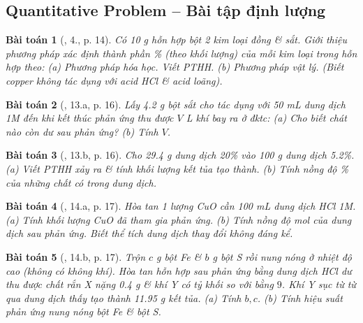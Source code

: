 \documentclass{article}
\newtheorem{baitoan}{Bài toán}
\begin{document}
\subsection{Quantitative Problem -- Bài tập định lượng}

\begin{baitoan}[\cite{SGK_Hoa_Hoc_9}, 4., p. 14]
	Có \emph{10 g} hỗn hợp bột 2 kim loại đồng \& sắt. Giới thiệu phương pháp xác định thành phần \% (theo khối lượng) của mỗi kim loại trong hỗn hợp theo: (a) Phương pháp hóa học. Viết PTHH. (b) Phương pháp vật lý. (Biết copper không tác dụng với acid \emph{HCl} \& acid \emph{} loãng).
\end{baitoan}

\begin{baitoan}[\cite{An_350_BT_Hoa_Hoc_9}, 13.a, p. 16]
	Lấy \emph{4.2 g} bột sắt cho tác dụng với \emph{50 mL} dung dịch \emph{ 1M} đến khi kết thúc phản ứng thu được $V$ \emph{L} khí \emph{} bay ra ở đktc: (a) Cho biết chát nào còn dư sau phản ứng? (b) Tính $V$.
\end{baitoan}

\begin{baitoan}[\cite{An_350_BT_Hoa_Hoc_9}, 13.b, p. 16]
	Cho \emph{29.4 g} dung dịch \emph{ 20\%} vào \emph{100 g} dung dịch \emph{ 5.2\%}. (a) Viết PTHH xảy ra \& tính khối lượng kết tủa tạo thành. (b) Tính nồng độ \% của những chất có trong dung dịch.
\end{baitoan}

\begin{baitoan}[\cite{An_350_BT_Hoa_Hoc_9}, 14.a, p. 17]
	Hòa tan 1 lượng \emph{CuO} cần \emph{100 mL} dung dịch \emph{HCl 1M}. (a) Tính khối lượng \emph{CuO} đã tham gia phản ứng. (b) Tính nồng độ mol của dung dịch sau phản ứng. Biết thể tích dung dịch thay đổi không đáng kể.
\end{baitoan}

\begin{baitoan}[\cite{An_350_BT_Hoa_Hoc_9}, 14.b, p. 17]
	Trộn $c$ \emph{g} bột \emph{Fe} \& $b$ \emph{g} bột \emph{S} rồi nung nóng ở nhiệt độ cao (không có không khí). Hòa tan hỗn hợp sau phản ứng bằng dung dịch \emph{HCl} dư thu được chất rắn X nặng \emph{0.4 g} \& khí Y có tỷ khối so với \emph{} bằng $9$. Khí Y sục từ từ qua dung dịch \emph{} thấy tạo thành \emph{11.95 g} kết tủa. (a) Tính $b,c$. (b) Tính hiệu suất phản ứng nung nóng bột \emph{Fe} \& bột \emph{S}.
\end{baitoan}
\end{document}
